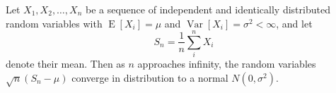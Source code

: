 \documentclass{article}
\begin{document}
Let $X_1, X_2, \ldots, X_n$ be a sequence of independent and
identically distributed random variables with
$\operatorname{E}[X_i] = \mu$ and
$\operatorname{Var}[X_i] = \sigma^2 < \infty$, and let
\begin{equation*}
S_n = \frac{1}{n}\sum_{i}^{n} X_i
\end{equation*}
denote their mean. Then as $n$ approaches infinity, the
random variables $\sqrt{n}(S_n - \mu)$ converge in
distribution to a normal $N(0, \sigma^2)$.

\end{document}
